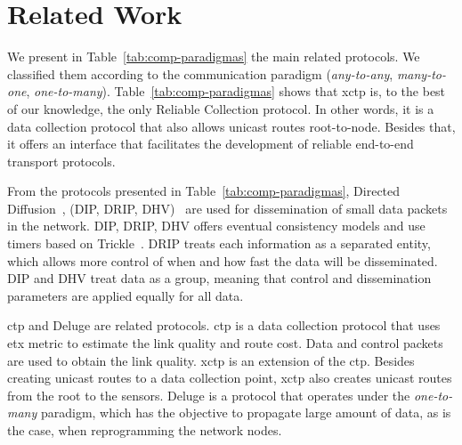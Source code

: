 \section{Related Work}
\label{sec:related-work}





We present in Table~\ref{tab:comp-paradigmas} the main related protocols. We classified them according to the communication paradigm (\textit{any-to-any}, \textit{many-to-one}, \textit{one-to-many}). Table~\ref{tab:comp-paradigmas} shows that \ac{xctp} is, to the best of our knowledge, the only Reliable Collection protocol. In other words, it is a data collection protocol that also allows unicast routes root-to-node. Besides that, it offers an interface that facilitates the development of reliable end-to-end transport protocols.

From the protocols presented in Table~\ref{tab:comp-paradigmas}, Directed Diffusion~\cite{directedDiffusion}, (DIP, DRIP, DHV)~\cite{tinyos} are used for dissemination of small data packets in the network. DIP, DRIP, DHV offers eventual consistency models and use timers based on Trickle~\cite{trickle}. DRIP treats each information as a separated entity, which allows more control of when and how fast the data will be disseminated. DIP and DHV treat data as a group, meaning that control and dissemination parameters are applied equally for all data.

\ac{ctp} and Deluge are related protocols. \ac{ctp} is a data collection protocol that uses \ac{etx} metric to estimate the link quality and route cost. Data and control packets are used to obtain the link quality. \ac{xctp} is an extension of the \ac{ctp}. Besides creating unicast routes to a data collection point, \ac{xctp} also creates unicast routes from the root to the sensors. Deluge is a protocol that operates under the \textit{one-to-many} paradigm, which has the objective to propagate large amount of data, as is the case, when reprogramming the network nodes.


